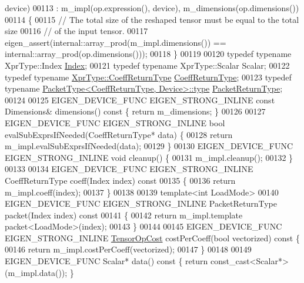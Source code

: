 \begin{DoxyCode}
      device)
00113       : m\_impl(op.expression(), device), m\_dimensions(op.dimensions())
00114   \{
00115     \textcolor{comment}{// The total size of the reshaped tensor must be equal to the total size}
00116     \textcolor{comment}{// of the input tensor.}
00117     eigen\_assert(internal::array\_prod(m\_impl.dimensions()) == internal::array\_prod(op.dimensions()));
00118   \}
00119 
00120   \textcolor{keyword}{typedef} \textcolor{keyword}{typename} XprType::Index \hyperlink{namespace_eigen_a62e77e0933482dafde8fe197d9a2cfde}{Index};
00121   \textcolor{keyword}{typedef} \textcolor{keyword}{typename} XprType::Scalar Scalar;
00122   \textcolor{keyword}{typedef} \textcolor{keyword}{typename} \hyperlink{group___sparse_core___module}{XprType::CoeffReturnType} 
      \hyperlink{group___sparse_core___module}{CoeffReturnType};
00123   \textcolor{keyword}{typedef} \textcolor{keyword}{typename} \hyperlink{group___sparse_core___module}{PacketType<CoeffReturnType, Device>::type} 
      \hyperlink{group___sparse_core___module}{PacketReturnType};
00124 
00125   EIGEN\_DEVICE\_FUNC EIGEN\_STRONG\_INLINE \textcolor{keyword}{const} Dimensions& dimensions()\textcolor{keyword}{ const }\{ \textcolor{keywordflow}{return} m\_dimensions; \}
00126 
00127   EIGEN\_DEVICE\_FUNC EIGEN\_STRONG\_INLINE \textcolor{keywordtype}{bool} evalSubExprsIfNeeded(CoeffReturnType* data) \{
00128     \textcolor{keywordflow}{return} m\_impl.evalSubExprsIfNeeded(data);
00129   \}
00130   EIGEN\_DEVICE\_FUNC EIGEN\_STRONG\_INLINE \textcolor{keywordtype}{void} cleanup() \{
00131     m\_impl.cleanup();
00132   \}
00133 
00134   EIGEN\_DEVICE\_FUNC EIGEN\_STRONG\_INLINE CoeffReturnType coeff(Index index)\textcolor{keyword}{ const}
00135 \textcolor{keyword}{  }\{
00136     \textcolor{keywordflow}{return} m\_impl.coeff(index);
00137   \}
00138 
00139   \textcolor{keyword}{template}<\textcolor{keywordtype}{int} LoadMode>
00140   EIGEN\_DEVICE\_FUNC EIGEN\_STRONG\_INLINE PacketReturnType packet(Index index)\textcolor{keyword}{ const}
00141 \textcolor{keyword}{  }\{
00142     \textcolor{keywordflow}{return} m\_impl.template packet<LoadMode>(index);
00143   \}
00144 
00145   EIGEN\_DEVICE\_FUNC EIGEN\_STRONG\_INLINE \hyperlink{class_eigen_1_1_tensor_op_cost}{TensorOpCost} costPerCoeff(\textcolor{keywordtype}{bool} vectorized)\textcolor{keyword}{ const }\{
00146     \textcolor{keywordflow}{return} m\_impl.costPerCoeff(vectorized);
00147   \}
00148 
00149   EIGEN\_DEVICE\_FUNC Scalar* data()\textcolor{keyword}{ const }\{ \textcolor{keywordflow}{return} \textcolor{keyword}{const\_cast<}Scalar*\textcolor{keyword}{>}(m\_impl.data()); \}

\end{DoxyCode}
